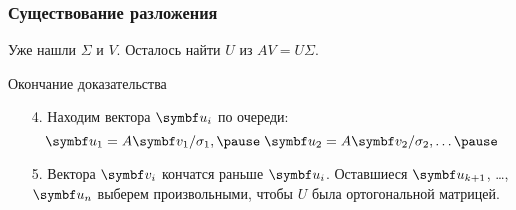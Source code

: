 \begin{frame}
\frametitle{Существование разложения}

Уже нашли $\Sigma$ и $V$. Осталось найти $U$ из $AV = U\Sigma$. \pause

\begin{block}{Окончание доказательства}
\begin{enumerate}

      \item[4.] Находим вектора $\bu_i$ по очереди:
      \[
        \bu_1 = A\bv_1 / \sigma_1, \pause \; \bu_2 = A\bv_2 / \sigma_2, \ldots \pause
      \]
      \item[5.] Вектора $\bv_i$ кончатся раньше $\bu_i$. \pause
      Оставшиеся $\bu_{k+1}$, \ldots, $\bu_{n}$ выберем произвольными, чтобы $U$ была ортогональной матрицей.

\end{enumerate}
\end{block}

  

\end{frame}









